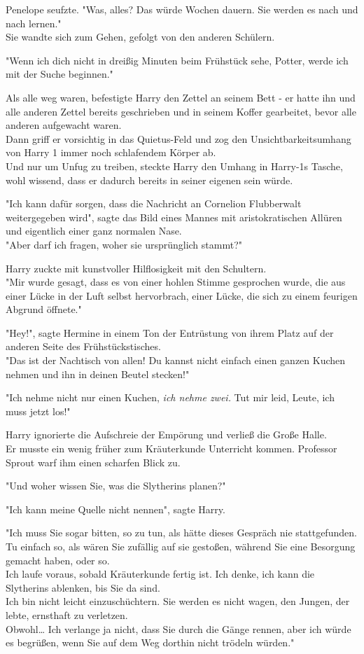 {Penelope seufzte. "Was, alles? Das würde Wochen dauern. Sie werden es nach und nach lernen."\\ Sie wandte sich zum Gehen, gefolgt von den anderen Schülern.

"Wenn ich dich nicht in dreißig Minuten beim Frühstück sehe, Potter, werde ich mit der Suche beginnen."

Als alle weg waren, befestigte Harry den Zettel an seinem Bett - er hatte ihn und alle anderen Zettel bereits geschrieben und in seinem Koffer gearbeitet, bevor alle anderen aufgewacht waren.\\ Dann griff er vorsichtig in das Quietus-Feld und zog den Unsichtbarkeitsumhang von Harry 1 immer noch schlafendem Körper ab.\\ Und nur um Unfug zu treiben, steckte Harry den Umhang in Harry-1s Tasche, wohl wissend, dass er dadurch bereits in seiner eigenen sein würde.

"Ich kann dafür sorgen, dass die Nachricht an Cornelion Flubberwalt weitergegeben wird", sagte das Bild eines Mannes mit aristokratischen Allüren und eigentlich einer ganz normalen Nase.\\ "Aber darf ich fragen, woher sie ursprünglich stammt?"

Harry zuckte mit kunstvoller Hilflosigkeit mit den Schultern.\\ "Mir wurde gesagt, dass es von einer hohlen Stimme gesprochen wurde, die aus einer Lücke in der Luft selbst hervorbrach, einer Lücke, die sich zu einem feurigen Abgrund öffnete."

"Hey!", sagte Hermine in einem Ton der Entrüstung von ihrem Platz auf der anderen Seite des Frühstückstisches.\\ "Das ist der Nachtisch von allen! Du kannst nicht einfach einen ganzen Kuchen nehmen und ihn in deinen Beutel stecken!"

"Ich nehme nicht nur einen Kuchen, \emph{ich nehme zwei.} Tut mir leid, Leute, ich muss jetzt los!"

Harry ignorierte die Aufschreie der Empörung und verließ die Große Halle.\\ Er musste ein wenig früher zum Kräuterkunde Unterricht kommen. Professor Sprout warf ihm einen scharfen Blick zu.

"Und woher wissen Sie, was die Slytherins planen?"

"Ich kann meine Quelle nicht nennen", sagte Harry.

"Ich muss Sie sogar bitten, so zu tun, als hätte dieses Gespräch nie stattgefunden. Tu einfach so, als wären Sie zufällig auf sie gestoßen, während Sie eine Besorgung gemacht haben, oder so.\\ Ich laufe voraus, sobald Kräuterkunde fertig ist. Ich denke, ich kann die Slytherins ablenken, bis Sie da sind.\\ Ich bin nicht leicht einzuschüchtern. Sie werden es nicht wagen, den Jungen, der lebte, ernsthaft zu verletzen.\\ Obwohl… Ich verlange ja nicht, dass Sie durch die Gänge rennen, aber ich würde es begrüßen, wenn Sie auf dem Weg dorthin nicht trödeln würden."

}
